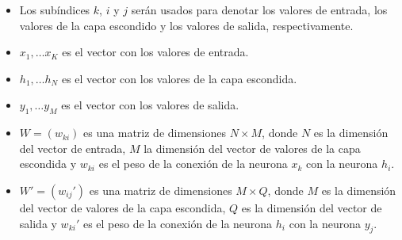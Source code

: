 \begin{itemize}
    \item Los subíndices $k$, $i$ y $j$ serán usados para denotar los valores de entrada, los valores de la
          capa escondido y los valores de salida, respectivamente.
    \item $x_1, \ldots x_K$ es el vector con los valores de entrada.
    \item $h_1, \ldots h_N$ es el vector con los valores de la capa escondida.
    \item $y_1, \ldots y_M$ es el vector con los valores de salida.
    \item $W = (w_{ki})$ es una matriz de dimensiones $N\times M$, donde $N$ es la dimensión
          del vector de entrada, $M$ la dimensión del vector de valores de la capa escondida y $w_{ki}$ es el peso de la conexión de la
          neurona $x_k$ con la neurona $h_i$.
    \item $W' = (w_{ij}')$ es una matriz de dimensiones $M\times Q$, donde $M$ es la dimensión
          del vector de valores de la capa escondida, $Q$ es la dimensión del vector de salida y $w_{ki}'$
          es el peso de la conexión de la neurona $h_i$ con la neurona $y_j$.
\end{itemize}

